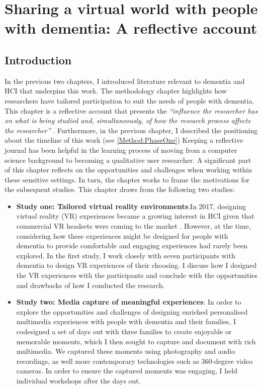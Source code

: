 \chapter{Sharing a virtual world with people with dementia: A reflective account}
\label{NegotatingReseacherParticipantRelationships}

\section{Introduction}
\label{CH4:Intro}
In the previous two chapters, I introduced literature relevant to dementia and HCI that underpins this work. The methodology chapter highlights how researchers have tailored participation to suit the needs of people with dementia. This chapter is a reflective account that presents the \textit{``influence the researcher has on what is being studied and, simultaneously, of how the research process affects the researcher''} \citep{probst2014double}. Furthermore, in the previous chapter, I described the positioning about the timeline of this work (see \ref{Method:PhaseOne}) Keeping a reflective journal has been helpful in the learning process of moving from a computer science background to becoming a qualitative user researcher. A significant part of this chapter reflects on the opportunities and challenges when working within these sensitive settings. In turn, the chapter works to frame the motivations for the subsequent studies. This chapter draws from the following two studies: 

\begin{itemize}
    \item  \textbf{Study one: Tailored virtual reality environments}:In 2017, designing virtual reality (VR) experiences became a growing interest in HCI given that commercial VR headsets were coming to the market \citep{hassan_digitality_2019}. However, at the time, considering how these experiences might be designed for people with dementia to provide comfortable and engaging experiences had rarely been explored. In the first study, I work closely with seven participants with dementia to design VR experiences of their choosing. I discuss how I designed the VR experiences with the participants and conclude with the opportunities and drawbacks of how I conducted the research.

    \item \textbf{Study two: Media capture of meaningful experiences}:    In order to explore the opportunities and challenges of designing enriched personalised multimedia experiences with people with dementia and their families, I codesigned a set of days out with three families to create enjoyable or memorable moments, which I then sought to capture and document with rich multimedia. We captured these moments using photography and audio recordings, as well more contemporary technologies such as 360-degree video cameras. In order to ensure the captured moments was engaging, I held individual workshops after the days out.
\end{itemize}

